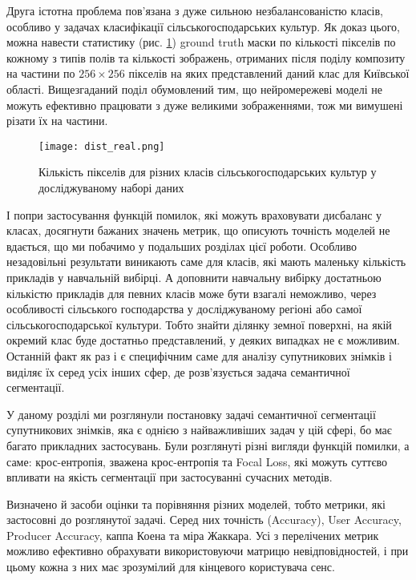 Друга істотна проблема пов'язана з дуже сильною
незбалансованістю класів, особливо у задачах класифікації
сільськогосподарських культур.
Як доказ цього, можна
навести статистику (рис. \ref{fig:pixels_per_class}) ground truth
маски по кількості пікселів по кожному з
типів полів та кількості зображень, отриманих після
поділу композиту на частини по $256 \times 256$ пікселів
на яких представлений даний клас для Київської області.
Вищезгаданий поділ обумовлений тим, що нейромережеві моделі не
можуть ефективно працювати з дуже великими зображеннями,
тож ми вимушені різати їх на частини.

\begin{figure}[ht!]
    \centering
    \texttt{[image: dist\_real.png]}
    \caption{Кількість пікселів для різних класів сільськогосподарських культур
        у досліджуваному наборі даних}
    \label{fig:pixels_per_class}
\end{figure}

І попри застосування
функцій помилок, які можуть враховувати дисбаланс у
класах, досягнути бажаних значень метрик, що описують точність
моделей не вдається, що ми побачимо у подальших розділах цієї роботи.
Особливо незадовільні результати виникають саме для класів,
які мають маленьку кількість прикладів у навчальній вибірці.
А доповнити навчальну вибірку достатньою кількістю
прикладів для певних класів може бути взагалі неможливо,
через особливості сільського господарства у досліджуваному регіоні
або самої сільськогосподарської культури. Тобто знайти
ділянку земної поверхні, на якій окремий клас
буде достатньо представлений, у деяких випадках
не є можливим. Останній факт як раз
і є специфічним саме для аналізу супутникових знімків і
виділяє їх серед усіх інших сфер,
де розв'язується задача семантичної сегментації.

\chapconclude{\ref{chap:sem_segm}}
У даному розділі ми розглянули постановку задачі семантичної сегментації
супутникових знімків, яка є однією з найважливіших
задач у цій сфері, бо має багато прикладних застосувань.
Були розглянуті різні вигляди функцій помилки, а саме: крос-ентропія,
зважена крос-ентропія та Focal Loss, які можуть суттєво впливати
на якість сегментації при застосуванні сучасних методів.

Визначено й засоби оцінки та порівняння різних моделей, тобто
метрики, які застосовні до розглянутої задачі. Серед них
точність (Accuracy), User Accuracy, Producer Accuracy,
каппа Коена та міра Жаккара. Усі з перелічених метрик можливо
ефективно обрахувати використовуючи матрицю невідповідностей, і при
цьому кожна з них має зрозумілий для кінцевого користувача сенс.

